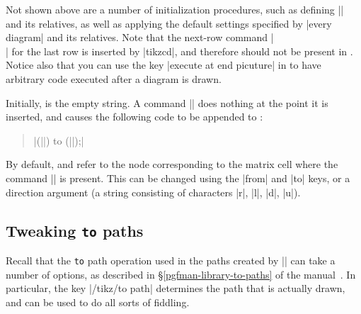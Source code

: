 \documentclass[a4paper]{ltxdoc}
\begin{document}
Not shown above are a number of initialization procedures, such as
defining |\arrow| and its relatives, as well as applying the default
settings specified by |every diagram| and its relatives.  Note that
the next-row command |\\| for the last row is inserted by |{tikzcd}|,
and therefore should not be present in .  Notice also
that you can use the key |execute at end picuture| in 
to have arbitrary \tikzname{} code executed after a diagram is drawn.

Initially,  is the empty string.  A command
|| does nothing at the point it is inserted,
and causes the following code to be appended to :
\begin{verse}
  | (||) to (||);|
\end{verse}
By default,  and  refer to the
node corresponding to the matrix cell where the command |\arrow| is
present.  This can be changed using the |from| and |to| keys, or a
direction argument (a string consisting of characters |r|, |l|, |d|,
|u|).

\subsection{Tweaking \texttt{to} paths}
\label{sec:tweaking-to-paths}

Recall that the \texttt{to} path operation used in the paths created by
|\arrow| can take a number of options, as described in 
\S\ref*{pgfman-library-to-paths} of the \pgfname{} manual~\cite{pgfman}.  In particular, the
key |/tikz/to path| determines the path that is actually drawn, and
can be used to do all sorts of fiddling.

\begin{codeexample}[]
\end{codeexample}%
\end{document}
